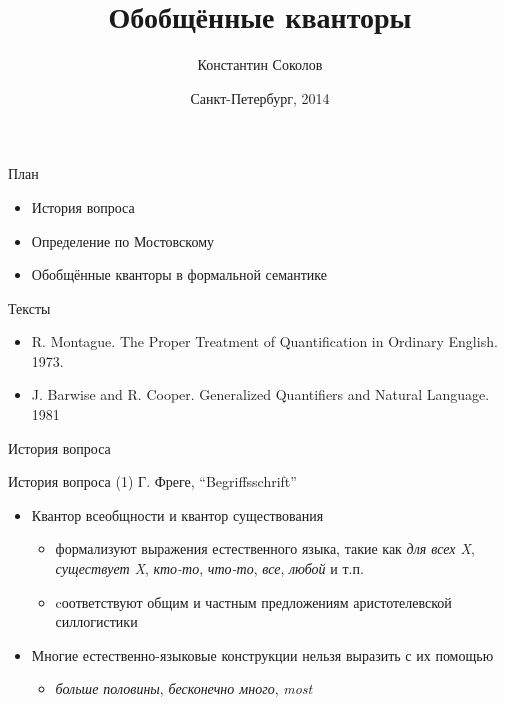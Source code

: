 \documentclass{beamer}
\begin{document}
\title{\Large{Обобщённые кванторы}}
\author{Константин Соколов}
\date{Санкт-Петербург, 2014} 
\begin{frame}
    \thispagestyle{empty}
    \titlepage
\end{frame}

\begin{frame}{План}
\setcounter{framenumber}{1}
    \begin{itemize}
		\item История вопроса
		\item Определение по Мостовскому
		\item Обобщённые кванторы в формальной семантике
    \end{itemize}
\end{frame}

\begin{frame}{Тексты}
\begin{itemize}
    \item R. Montague. The Proper Treatment of Quantification in Ordinary English. 1973.
	\item J. Barwise and R. Cooper. Generalized Quantifiers and Natural Language. 1981
\end{itemize}
\end{frame}

\begin{frame}{}
\begin{center}
История вопроса
\end{center}
\end{frame}

\begin{frame}{История вопроса (1)}
Г. Фреге, ``Begriffsschrift''\\
\bigskip
\begin{itemize}
	\item Квантор всеобщности и квантор существования 
	    \medskip
	    \begin{itemize}
	        \item формализуют выражения естественного языка, такие как \textit{для всех X}, \textit{существует X}, \textit{кто-то}, \textit{что-то}, \textit{все}, \textit{любой} и т.п.
	        \medskip
        	\item cоответствуют общим и частным предложениям аристотелевской силлогистики
        \end{itemize}
    \bigskip
    \item Многие естественно-языковые конструкции нельзя выразить с их помощью
        \medskip
        \begin{itemize}
            \item \textit{больше половины}, \textit{бесконечно много}, \textit{most}
        \end{itemize}
\end{itemize}
\end{frame}
\end{document}
